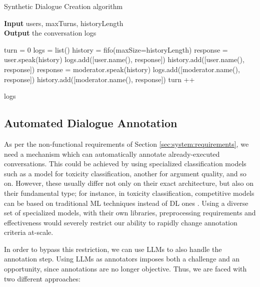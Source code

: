 \begin{algorithm}
	\caption{Synthetic Dialogue Creation algorithm} 
	\label{al::dialogue-creation}
	\hspace*{\algorithmicindent} \textbf{Input} users, maxTurns, historyLength\\
	\hspace*{\algorithmicindent} \textbf{Output} the conversation logs
	\begin{algorithmic}[1]	
		\State turn = 0
		\State logs = list()
		\State history = fifo(maxSize=historyLength)
		\State 
		\State response = user.speak(history)
		\State logs.add([user.name(), response])
		\State history.add([user.name(), response])
		\State
		\State response = moderator.speak(history)
		\State logs.add([moderator.name(), response])
		\State history.add([moderator.name(), response])
		\EndFor
		\State turn ++
		\EndWhile
		
		\State \Return logs
		
	\end{algorithmic} 
\end{algorithm}



\subsection{Automated Dialogue Annotation}
\label{ssec:system:annotation}

As per the non-functional requirements of Section \ref{sec:system:requirements}, we need a mechanism which can automatically annotate already-executed conversations. This could be achieved by using specialized classification models such as a model for toxicity classification, another for argument quality, and so on. However, these usually differ not only on their exact architecture, but also on their fundamental type; for instance, in toxicity classification, competitive models can be based on traditional \ac{ML} techniques instead of \ac{DL} ones \cite{anjum2024hate}. Using a diverse set of specialized models, with their own libraries, preprocessing requirements and effectiveness would severely restrict our ability to rapidly change annotation criteria at-scale. 

In order to bypass this restriction, we can use LLMs to also handle the annotation step. Using LLMs as annotators imposes both a challenge and an opportunity, since annotations are no longer objective. Thus, we are faced with two different approaches:

